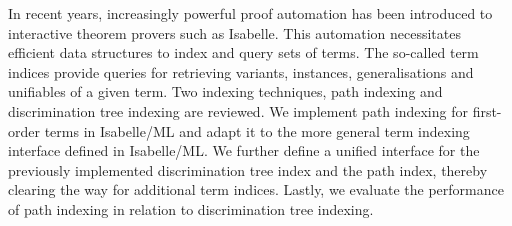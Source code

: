 \thispagestyle{empty}
\vspace*{20mm}

\begin{center}
\textbf{{\abstractname}}
\end{center}

\vspace{10mm}
In recent years, increasingly powerful proof automation has been introduced to interactive theorem provers such as Isabelle.
This automation necessitates efficient data structures to index and query sets of terms.
The so-called term indices provide queries for retrieving variants, instances, generalisations and unifiables of a given term.
Two indexing techniques, path indexing and discrimination tree indexing are reviewed.
We implement path indexing for first-order terms in Isabelle/ML and adapt it to the more general term indexing interface defined in Isabelle/ML.
We further define a unified interface for the previously implemented discrimination tree index and the path index, thereby clearing the way for additional term indices.
Lastly, we evaluate the performance of path indexing in relation to discrimination tree indexing.

\cleardoublepage{}
